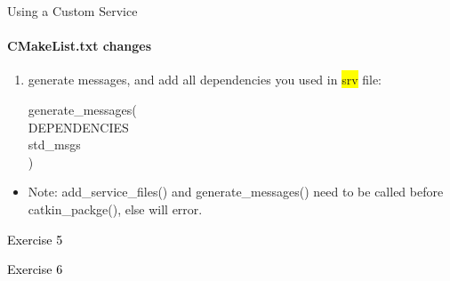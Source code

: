 \documentclass{beamer}
\begin{document}
\begin{frame}{Using a Custom Service}
    \framesubtitle{CMakeList.txt changes}
    
    \scriptsize
    \begin{enumerate}

        \item generate messages, and add all dependencies you used in {\ttfamily \colorbox{yellow}{srv}} file:
        \begin{focus}
            \ttfamily \scriptsize
            generate\_messages(\\
            DEPENDENCIES\\
            std\_msgs\\
            )
        \end{focus}  
        
    \end{enumerate}
    
    \begin{itemize}
        \item Note: {\ttfamily \colorbox{gray!30!white}{add\_service\_files()}} and {\ttfamily \colorbox{gray!30!white}{generate\_messages()}} need to be called before {\ttfamily \colorbox{gray!30!white}{catkin\_packge()}}, else will error.
    \end{itemize}
    
\end{frame}

\begin{frame}[plain]{}  
    \centering
    {\huge \textcolor{black}{Exercise 5}}
\end{frame}


\begin{frame}[plain]{}  
    \centering
    {\huge \textcolor{black}{Exercise 6}}
\end{frame}
\end{document}
